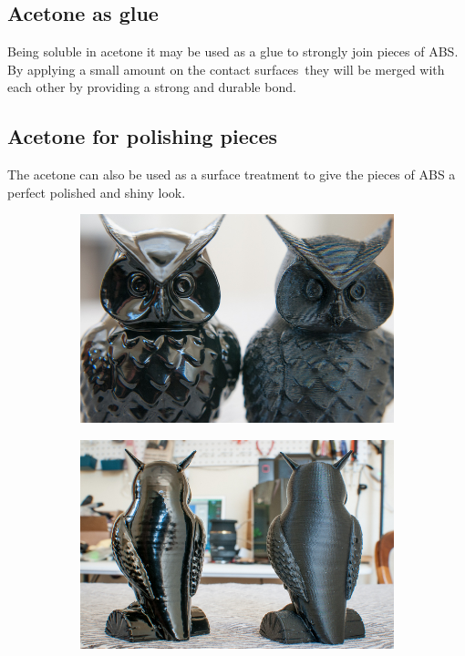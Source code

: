 \documentclass[11pt,a4paper]{article}
\begin{document}
	\subsection{Acetone as glue}Being soluble in acetone it may be used as a glue to strongly join pieces of ABS. By applying a small amount on the contact surfaces they will be merged with each other by providing a strong and durable bond. 
	\subsection{Acetone for polishing pieces}The acetone can also be used as a surface treatment to give the pieces of ABS a perfect polished and shiny look.
\begin{figure}[H]
    \centering
    \begin{subfigure}[b]{0.4\textwidth}
        \includegraphics[width=\textwidth,cfbox=azul_marcos 4pt 0pt]{FOTOS/VAPORACETONA1}
    \end{subfigure}
    \qquad %
    \begin{subfigure}[b]{0.4\textwidth}
        \includegraphics[width=\textwidth,cfbox=azul_marcos 4pt 0pt]{FOTOS/VAPORACETONA2}
    \end{subfigure}   
\end{figure}
\end{document}

